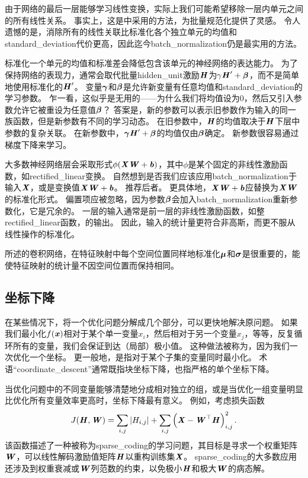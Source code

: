 由于网络的最后一层能够学习线性变换，实际上我们可能希望移除一层内单元之间的所有线性关系。
事实上，这是\cite{Desjardins2015}中采用的方法，为批量规范化提供了灵感。
令人遗憾的是，消除所有的线性关联比标准化各个独立单元的均值和\gls{standard_deviation}代价更高，因此迄今\gls{batch_normalization}仍是最实用的方法。


标准化一个单元的均值和标准差会降低包含该单元的神经网络的表达能力。
为了保持网络的表现力，通常会取代批量\gls{hidden_unit}激励$\boldsymbol{\mathit{H}}$为$\gamma \boldsymbol{\mathit{H}}' + \boldsymbol{\beta}$，而不是简单地使用标准化的$\boldsymbol{\mathit{H}}'$。
变量$\boldsymbol{\gamma}$和$\boldsymbol{\beta}$是允许新变量有任意均值和\gls{standard_deviation}的学习参数。
乍一看，这似乎是无用的——为什么我们将均值设为$0$，然后又引入参数允许它被重设为任意值$\boldsymbol{\beta}$？
答案是，新的参数可以表示旧参数作为输入的同一族函数，但是新参数有不同的学习动态。
在旧参数中，$\boldsymbol{\mathit{H}}$的均值取决于$\boldsymbol{\mathit{H}}$下层中参数的复杂关联。
在新参数中，$\boldsymbol{\gamma} \boldsymbol{\mathit{H}}' + \boldsymbol{\beta}$的均值仅由$\boldsymbol{\beta}$确定。
新参数很容易通过梯度下降来学习。

大多数神经网络层会采取形式$\phi(\boldsymbol{\mathit{X}}\boldsymbol{\mathit{W}}+ \boldsymbol{\mathit{b}})$，其中$\phi$是某个固定的非线性激励函数，如\gls{rectified_linear}变换。
自然想到是否我们应该应用\gls{batch_normalization}于输入$\boldsymbol{\mathit{X}}$，或是变换值$\boldsymbol{\mathit{X}}\boldsymbol{\mathit{W}}+\boldsymbol{\mathit{b}}$。
\cite{Ioffe+Szegedy-2015}推荐后者。
更具体地，$\boldsymbol{\mathit{X}}\boldsymbol{\mathit{W}}+\boldsymbol{\mathit{b}}$应替换为$\boldsymbol{\mathit{X}}\boldsymbol{\mathit{W}}$的标准化形式。
偏置项应被忽略，因为参数$\boldsymbol{\beta}$会加入\gls{batch_normalization}重新参数化，它是冗余的。
一层的输入通常是前一层的非线性激励函数，如整\gls{rectified_linear}函数，的输出。
因此，输入的统计量更符合非高斯，而更不服从线性操作的标准化。

所述的卷积网络，在特征映射中每个空间位置同样地标准化$\boldsymbol{\mu}$和$\boldsymbol{\sigma}$是很重要的，能使特征映射的统计量不因空间位置而保持相同。

\subsection{坐标下降}
\label{sec:coordinate_descent}
在某些情况下，将一个优化问题分解成几个部分，可以更快地解决原问题。
如果我们最小化$f(\boldsymbol{\mathit{x}})$相对于某个单一变量$x_i$，然后相对于另一个变量$x_j$，等等，反复循环所有的变量，我们会保证到达（局部）极小值。
这种做法被称为，因为我们一次优化一个坐标。
更一般地，是指对于某个子集的变量同时最小化。
术语``\gls{coordinate_descent}''通常既指块坐标下降，也指严格的单个坐标下降。


当优化问题中的不同变量能够清楚地分成相对独立的组，或是当优化一组变量明显比优化所有变量效率更高时，坐标下降最有意义。
例如，考虑损失函数
\begin{equation}
    J(\boldsymbol{\mathit{H}}, \boldsymbol{\mathit{W}}) = \sum_{i,j} |H_{i,j}| + \sum_{i,j} \left( \boldsymbol{\mathit{X}} - \boldsymbol{\mathit{W}}^\top \boldsymbol{\mathit{H}} \right)_{i,j}^2 .
\end{equation}
该函数描述了一种被称为\gls{sparse_coding}的学习问题，其目标是寻求一个权重矩阵$\boldsymbol{\mathit{W}}$，可以线性解码激励值矩阵$\boldsymbol{\mathit{H}}$以重构训练集$\boldsymbol{\mathit{X}}$。
\gls{sparse_coding}的大多数应用还涉及到权重衰减或$\boldsymbol{\mathit{W}}$列范数的约束，以免极小$\boldsymbol{\mathit{H}}$和极大$\boldsymbol{\mathit{W}}$的病态解。

